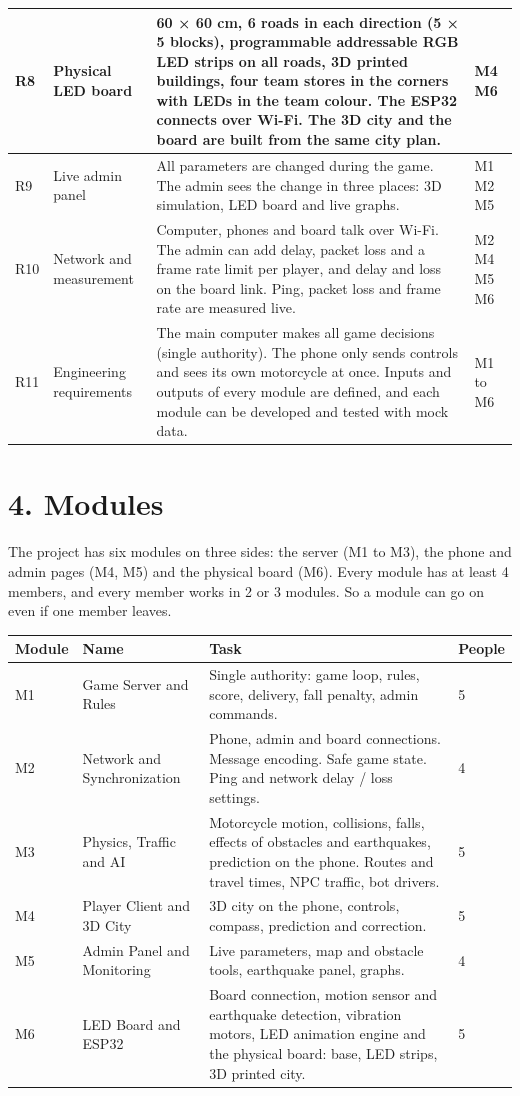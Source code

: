 \documentclass[
  english,
  10pt,
  a4paper,
]{article}
\newcommand{\ckkeep}[1]{\par\noindent\begin{minipage}{\linewidth}\setlength{\parskip}{4pt}#1\end{minipage}\par\smallskip}
\begin{document}
{\begin{tabular}{|L{0.05}|L{0.16}|L{0.63}|L{0.16}|}
R8 & Physical LED board & 60 × 60 cm, 6 roads in each direction (5 × 5 blocks), programmable addressable RGB LED strips on all roads, 3D printed buildings, four team stores in the corners with LEDs in the team colour. The ESP32 connects over Wi-Fi. The 3D city and the board are built from the same city plan. & M4 M6 \\ \hline
R9 & Live admin panel & All parameters are changed during the game. The admin sees the change in three places: 3D simulation, LED board and live graphs. & M1 M2 M5 \\ \hline
R10 & Network and measurement & Computer, phones and board talk over Wi-Fi. The admin can add delay, packet loss and a frame rate limit per player, and delay and loss on the board link. Ping, packet loss and frame rate are measured live. & M2 M4 M5 M6 \\ \hline
R11 & Engineering requirements & The main computer makes all game decisions (single authority). The phone only sends controls and sees its own motorcycle at once. Inputs and outputs of every module are defined, and each module can be developed and tested with mock data. & M1 to M6 \\ \hline
\end{tabular}}

\section{4. Modules}

\ckkeep{%
The project has six modules on three sides: the server (M1 to M3), the phone and admin pages (M4,
M5) and the physical board (M6). Every module has at least 4 members, and every member works in 2 or
3 modules. So a module can go on even if one member leaves.

\begin{tabular}{|L{0.10}|L{0.27}|L{0.54}|L{0.09}|}
\hline \textbf{Module} & \textbf{Name} & \textbf{Task} & \textbf{People} \\ \hline 
M1 & Game Server and Rules & Single authority: game loop, rules, score, delivery, fall penalty, admin commands. & 5 \\ \hline
M2 & Network and Synchronization & Phone, admin and board connections. Message encoding. Safe game state. Ping and network delay / loss settings. & 4 \\ \hline
M3 & Physics, Traffic and AI & Motorcycle motion, collisions, falls, effects of obstacles and earthquakes, prediction on the phone. Routes and travel times, NPC traffic, bot drivers. & 5 \\ \hline
M4 & Player Client and 3D City & 3D city on the phone, controls, compass, prediction and correction. & 5 \\ \hline
M5 & Admin Panel and Monitoring & Live parameters, map and obstacle tools, earthquake panel, graphs. & 4 \\ \hline
M6 & LED Board and ESP32 & Board connection, motion sensor and earthquake detection, vibration motors, LED animation engine and the physical board: base, LED strips, 3D printed city. & 5 \\ \hline
\end{tabular}}
\end{document}
